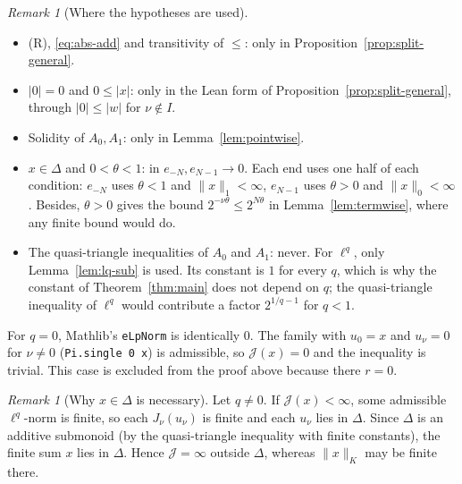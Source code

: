 \documentclass[11pt]{article}
\theoremstyle{definition}
\theoremstyle{remark}
\newtheorem{remark}[theorem]{Remark}
\newcommand{\abs}[1]{\lvert #1\rvert}
\newcommand{\norm}[2]{\lVert #1\rVert_{#2}}
\newcommand{\cJ}{\mathcal J}
\begin{document}
\begin{remark}[Where the hypotheses are used]
  \leavevmode
  \begin{itemize}
    \item (R), \eqref{eq:abs-add} and transitivity of \(\le\): only in
      Proposition~\ref{prop:split-general}.
    \item \(\abs{0} = 0\) and \(0 \le \abs{x}\): only in the Lean form of
      Proposition~\ref{prop:split-general}, through \(\abs{0} \le \abs{w}\) for \(\nu \notin I\).
    \item Solidity of \(A_0, A_1\): only in Lemma~\ref{lem:pointwise}.
    \item \(x \in \Delta\) and \(0 < \theta < 1\): in \(e_{-N}, e_{N-1} \to 0\). Each end
      uses one half of each condition: \(e_{-N}\) uses \(\theta < 1\) and
      \(\norm{x}{1} < \infty\), \(e_{N-1}\) uses \(\theta > 0\) and \(\norm{x}{0} < \infty\).
      Besides, \(\theta > 0\) gives the bound \(2^{-\nu\theta} \le 2^{N\theta}\) in
      Lemma~\ref{lem:termwise}, where any finite bound would do.
    \item The quasi-triangle inequalities of \(A_0\) and \(A_1\): never. For \(\ell^q\), only
      Lemma~\ref{lem:lq-sub} is used. Its constant is \(1\) for every \(q\), which is why the
      constant of Theorem~\ref{thm:main} does not depend on \(q\); the quasi-triangle
      inequality of \(\ell^q\) would contribute a factor \(2^{1/q-1}\) for \(q < 1\).
  \end{itemize}
  For \(q = 0\), Mathlib's \texttt{eLpNorm} is identically \(0\). The family with \(u_0 = x\)
  and \(u_\nu = 0\) for \(\nu \ne 0\) (\texttt{Pi.single 0 x}) is admissible, so
  \(\cJ(x) = 0\) and the inequality is trivial. This case is excluded from the proof above
  because there \(r = 0\).
\end{remark}

\begin{remark}[Why \(x \in \Delta\) is necessary]
  Let \(q \neq 0\). If \(\cJ(x) < \infty\), some admissible \(\ell^q\)-norm is finite, so each
  \(J_\nu(u_\nu)\) is finite and each \(u_\nu\) lies in \(\Delta\). Since \(\Delta\) is an
  additive submonoid (by the quasi-triangle inequality with finite constants), the finite sum
  \(x\) lies in \(\Delta\). Hence \(\cJ = \infty\) outside \(\Delta\), whereas
  \(\norm{x}{K}\) may be finite there.
\end{remark}
\end{document}
